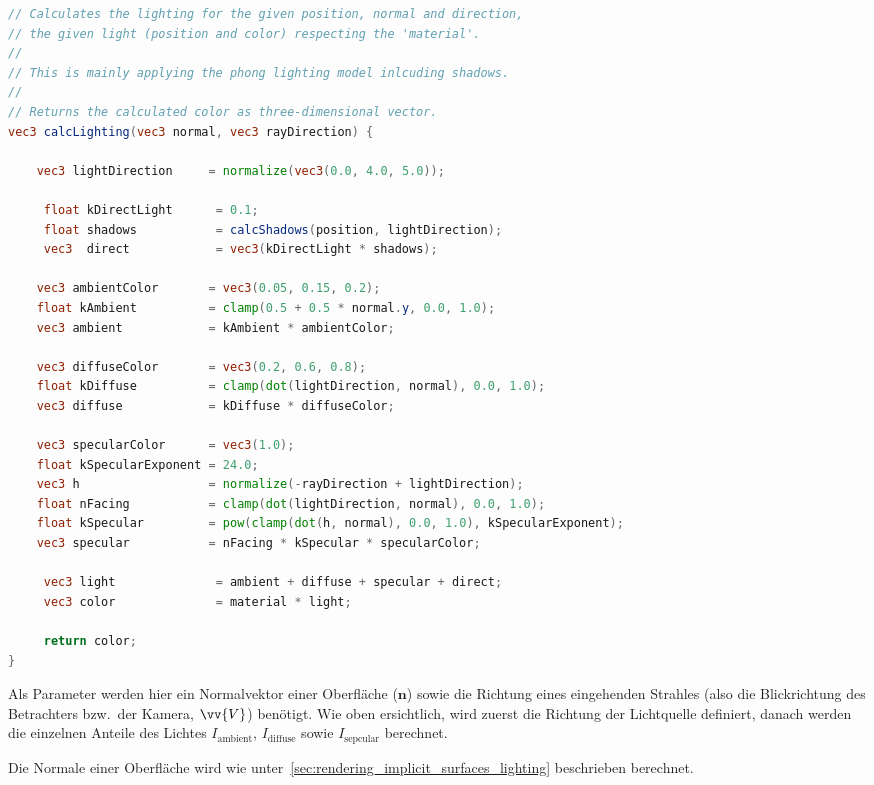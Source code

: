 \begin{minipage}{\linewidth}
\begin{lstlisting}[language=GLSL,caption={Umsetzung des
        Phong-Beleuchtungsmodelles in
        GLSL.},label={alg:glsl_lighting},captionpos=b,emph={calcLighting}]
// Calculates the lighting for the given position, normal and direction,
// the given light (position and color) respecting the 'material'.
//
// This is mainly applying the phong lighting model inlcuding shadows.
//
// Returns the calculated color as three-dimensional vector.
vec3 calcLighting(vec3 normal, vec3 rayDirection) {

    vec3 lightDirection     = normalize(vec3(0.0, 4.0, 5.0));

     float kDirectLight      = 0.1;
     float shadows           = calcShadows(position, lightDirection);
     vec3  direct            = vec3(kDirectLight * shadows);

    vec3 ambientColor       = vec3(0.05, 0.15, 0.2);
    float kAmbient          = clamp(0.5 + 0.5 * normal.y, 0.0, 1.0);
    vec3 ambient            = kAmbient * ambientColor;

    vec3 diffuseColor       = vec3(0.2, 0.6, 0.8);
    float kDiffuse          = clamp(dot(lightDirection, normal), 0.0, 1.0);
    vec3 diffuse            = kDiffuse * diffuseColor;

    vec3 specularColor      = vec3(1.0);
    float kSpecularExponent = 24.0;
    vec3 h                  = normalize(-rayDirection + lightDirection);
    float nFacing           = clamp(dot(lightDirection, normal), 0.0, 1.0);
    float kSpecular         = pow(clamp(dot(h, normal), 0.0, 1.0), kSpecularExponent);
    vec3 specular           = nFacing * kSpecular * specularColor;

     vec3 light              = ambient + diffuse + specular + direct;
     vec3 color              = material * light;
 
     return color;
}
\end{lstlisting}
\end{minipage}

Als Parameter werden hier ein Normalvektor einer Oberfläche ($\bm{n}$)
sowie die Richtung eines eingehenden Strahles (also die Blickrichtung
des Betrachters bzw.\ der Kamera, $\vv{V}$) benötigt.
Wie oben ersichtlich, wird zuerst die Richtung der Lichtquelle definiert,
danach werden die einzelnen Anteile des Lichtes $I_{\text{ambient}}$,
$I_{\text{diffuse}}$ sowie $I_{\text{sepcular}}$ berechnet.

Die Normale einer Oberfläche wird wie
unter~\autoref{sec:rendering_implicit_surfaces_lighting} beschrieben
berechnet.

